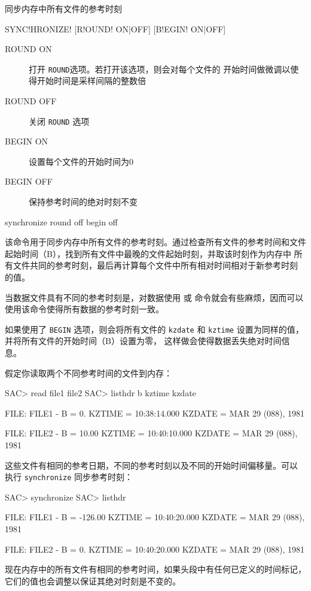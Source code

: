 \label{cmd:synchronize}

同步内存中所有文件的参考时刻

\begin{SACSTX}
SYNC!HRONIZE! [R!OUND! ON|OFF] [B!EGIN! ON|OFF]
\end{SACSTX}

\begin{description}
\item [ROUND ON] 打开 \texttt{ROUND}选项。若打开该选项，则会对每个文件的
    开始时间做微调以使得开始时间是采样间隔的整数倍
\item [ROUND OFF] 关闭 \texttt{ROUND} 选项
\item [BEGIN ON] 设置每个文件的开始时间为0
\item [BEGIN OFF] 保持参考时间的绝对时刻不变
\end{description}

\begin{SACDFT}
synchronize round off begin off
\end{SACDFT}

该命令用于同步内存中所有文件的参考时刻。通过检查所有文件的参考时间和文件
起始时间（B），找到所有文件中最晚的文件起始时刻，并取该时刻作为内存中
所有文件共同的参考时刻，最后再计算每个文件中所有相对时间相对于新参考时刻
的值。

当数据文件具有不同的参考时刻是，对数据使用  或 
命令就会有些麻烦，因而可以使用该命令使得所有数据的参考时刻一致。

如果使用了 \texttt{BEGIN} 选项，则会将所有文件的 \texttt{kzdate} 和
\texttt{kztime} 设置为同样的值，并将所有文件的开始时间（B）设置为零，
这样做会使得数据丢失绝对时间信息。

假定你读取两个不同参考时间的文件到内存：
\begin{SACCode}
SAC> read file1 file2
SAC> listhdr b kztime kzdate

  FILE: FILE1
  -
  B = 0.
  KZTIME = 10:38:14.000
  KZDATE = MAR 29 (088), 1981

  FILE: FILE2
  -
  B = 10.00
  KZTIME = 10:40:10.000
  KZDATE = MAR 29 (088), 1981
\end{SACCode}

这些文件有相同的参考日期，不同的参考时刻以及不同的开始时间偏移量。可以
执行 \texttt{synchronize} 同步参考时刻：
\begin{SACCode}
SAC> synchronize
SAC> listhdr

  FILE: FILE1
  -
  B = -126.00
  KZTIME = 10:40:20.000
  KZDATE = MAR 29 (088), 1981

  FILE: FILE2
  -
  B = 0.
  KZTIME = 10:40:20.000
  KZDATE = MAR 29 (088), 1981
\end{SACCode}
现在内存中的所有文件有相同的参考时间，如果头段中有任何已定义的时间标记，
它们的值也会调整以保证其绝对时刻是不变的。

